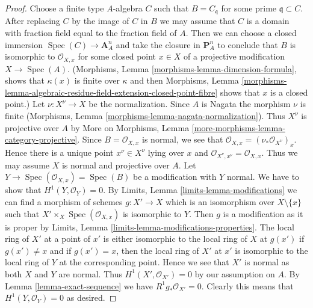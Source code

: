 \documentclass[10pt,a4paper]{amsart}
\theoremstyle{plain}
\theoremstyle{definition}
\theoremstyle{remark}
\numberwithin{equation}{subsection}
\def\Spec{\mathop{\mathrm{Spec}}}
\begin{document}
\begin{proof}
Choose a finite type $A$-algebra $C$ such that $B = C_\mathfrak q$
for some prime $\mathfrak q \subset C$. After replacing
$C$ by the image of $C$ in $B$ we may assume that $C$ is a domain
with fraction field equal to the fraction field of $A$.
Then we can choose a closed immersion $\Spec(C) \to \mathbf{A}^n_A$
and take the closure in $\mathbf{P}^n_A$ to conclude that $B$
is isomorphic to $\mathcal{O}_{X, x}$ for some closed point $x \in X$
of a projective modification $X \to \Spec(A)$.
(Morphisms, Lemma \ref{morphisms-lemma-dimension-formula},
shows that $\kappa(x)$ is finite over $\kappa$ and then
Morphisms, Lemma
\ref{morphisms-lemma-algebraic-residue-field-extension-closed-point-fibre}
shows that $x$ is a closed point.)
Let $\nu : X^\nu \to X$ be the normalization.
Since $A$ is Nagata the morphism $\nu$ is finite (Morphisms, Lemma
\ref{morphisms-lemma-nagata-normalization}).
Thus $X^\nu$ is projective over $A$ by
More on Morphisms, Lemma
\ref{more-morphisms-lemma-category-projective}.
Since $B = \mathcal{O}_{X, x}$ is normal, we see that
$\mathcal{O}_{X, x} = (\nu_*\mathcal{O}_{X^\nu})_x$.
Hence there is a unique point $x^\nu \in X^\nu$ lying over $x$
and $\mathcal{O}_{X^\nu, x^\nu} = \mathcal{O}_{X, x}$.
Thus we may assume $X$ is normal and projective over $A$.
Let $Y \to \Spec(\mathcal{O}_{X, x}) = \Spec(B)$
be a modification with $Y$ normal.
We have to show that $H^1(Y, \mathcal{O}_Y) = 0$. By
Limits, Lemma \ref{limits-lemma-modifications}
we can find a morphism of schemes $g : X' \to X$ which is an isomorphism
over $X \setminus \{x\}$ such that $X' \times_X \Spec(\mathcal{O}_{X, x})$
is isomorphic to $Y$. Then $g$ is a modification as it is proper by
Limits, Lemma \ref{limits-lemma-modifications-properties}.
The local ring of $X'$ at a point of $x'$ is either isomorphic
to the local ring of $X$ at $g(x')$ if $g(x') \not = x$ and
if $g(x') = x$, then the local ring of $X'$ at $x'$ is isomorphic
to the local ring of $Y$ at the corresponding point. Hence we see
that $X'$ is normal as both $X$ and $Y$ are normal.
Thus $H^1(X', \mathcal{O}_{X'}) = 0$ by our assumption on $A$.
By Lemma \ref{lemma-exact-sequence} we have $R^1g_*\mathcal{O}_{X'} = 0$.
Clearly this means that $H^1(Y, \mathcal{O}_Y) = 0$ as desired.
\end{proof}
\end{document}
